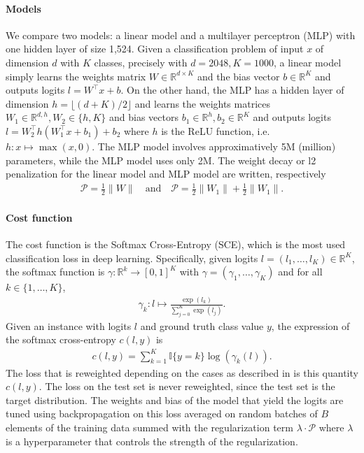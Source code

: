 \documentclass[12pt]{article}
\newcommand{\I}[0]{\mathbb{I}}
\newcommand{\R}[0]{\mathbb{R}}
\def\R{\mathbb{R}}
\def\I{{\mathbb I}}
\begin{document}
\paragraph{Models} We compare two models: a linear model and a multilayer perceptron (MLP) with
one hidden layer of size 1,524.  Given a classification problem of input $x$ of dimension $d$
with $K$ classes, precisely with $d=2048, K=1000$, a linear model simply learns the weights matrix $W \in
\R^{d\times K}$ and the bias vector $b \in \R^K$ and outputs logits 
$l = W^\top x + b$. On the other hand, the MLP has a hidden layer of dimension
$h = \lfloor(d+K)/2 \rfloor$ and learns the weights matrices 
$W_1\in \R^{d, h}, W_2 \in \{ h, K \}$ and bias vectors $b_1 \in \R^h, 
b_2 \in \R^K$ and outputs logits $l = W_2^\top h(W_1^\top x + b_1) + b_2$
where $h$ is the ReLU function, i.e. $h: x \mapsto \max(x,0)$. The MLP model
involves approximatively 5M (million) parameters, while the MLP model uses only
2M. The weight decay or l2 penalization for the linear model 
and MLP model are written, respectively
\begin{align*}
    \mathcal{P} = \frac{1}{2} \lVert W \rVert \quad \text{and} \quad 
    \mathcal{P} = \frac{1}{2} \lVert W_1 \rVert + \frac{1}{2} \lVert W_1 \rVert.
\end{align*}

\paragraph{Cost function}
The cost function is the Softmax Cross-Entropy (SCE), which is the most used
classification loss in deep learning. Specifically, given logits $l = 
(l_1,\dots,l_K) \in \R^K$, the softmax function is $\gamma : \R^k \to [0,1]^K$
with $\gamma = (\gamma_1, \dots, \gamma_K)$ and for all $k \in \{1,\dots,K\}$,
\begin{align*}
    \gamma_k : l \mapsto \frac{\exp(l_k)}{\sum_{j=0}^K \exp(l_j)}.
\end{align*}
Given an instance with logits $l$ and ground truth class value $y$, the
expression of the softmax cross-entropy $c(l,y)$ is
\begin{align*}
    c(l,y) = \sum_{k=1}^K \I\{ y = k \} \log \left(\gamma_k(l)\right).
\end{align*}
The loss that is reweighted depending on the cases as described in
 is this quantity $c(l,y)$. The loss on the test set is never
reweighted, since the test set is the target distribution.  The weights and
bias of the model that yield the logits are tuned using backpropagation on this
loss averaged on random batches of $B$ elements of the training data summed
with the regularization term $\lambda \cdot \mathcal{P}$ where $\lambda$ is a
hyperparameter that controls the strength of the regularization. 
\end{document}
